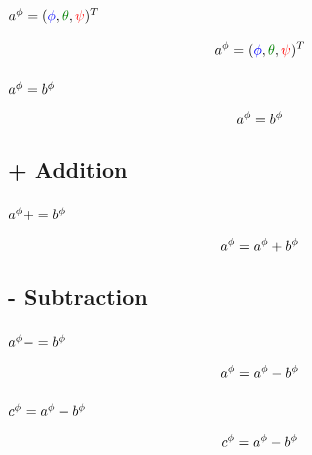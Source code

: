 \subsubsection*{$\eu a = \transp{(\Roll,\Pitch,\Yaw)}$}
\begin{equation}
\eu a = \transp{(\Roll,\Pitch,\Yaw)}
\end{equation}

\subsubsection*{$a^{\phi} = b^{\phi}$}
\begin{equation}
a^{\phi} = b^{\phi}
\end{equation}



\subsection{+ Addition}
\subsubsection*{$a^{\phi} += b^{\phi}$}
\begin{equation}
a^{\phi} = a^{\phi} + b^{\phi}
\end{equation}



\subsection{- Subtraction}
\subsubsection*{$a^{\phi} -= b^{\phi}$}
\begin{equation}
a^{\phi} = a^{\phi} - b^{\phi}
\end{equation}

\subsubsection*{$c^{\phi} = a^{\phi} - b^{\phi}$}
\begin{equation}
c^{\phi} = a^{\phi} - b^{\phi}
\end{equation}




